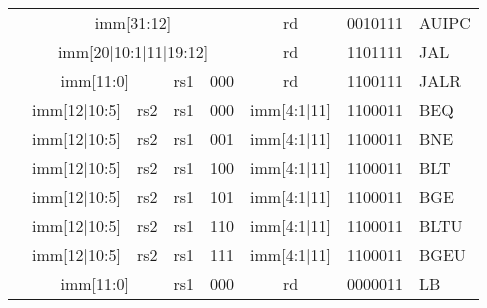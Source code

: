 \begin{table}[p]
\begin{small}
\begin{center}
\begin{tabular}{p{0in}p{0.4in}p{0.05in}p{0.05in}p{0.05in}p{0.05in}p{0.4in}p{0.6in}p{0.4in}p{0.6in}p{0.7in}l}
&
\multicolumn{8}{|c|}{imm[31:12]} &
\multicolumn{1}{c|}{rd} &
\multicolumn{1}{c|}{0010111} & AUIPC \\
\cline{2-11}
  

&
\multicolumn{8}{|c|}{imm[20$\vert$10:1$\vert$11$\vert$19:12]} &
\multicolumn{1}{c|}{rd} &
\multicolumn{1}{c|}{1101111} & JAL \\
\cline{2-11}
  

&
\multicolumn{6}{|c|}{imm[11:0]} &
\multicolumn{1}{c|}{rs1} &
\multicolumn{1}{c|}{000} &
\multicolumn{1}{c|}{rd} &
\multicolumn{1}{c|}{1100111} & JALR \\
\cline{2-11}
  

&
\multicolumn{4}{|c|}{imm[12$\vert$10:5]} &
\multicolumn{2}{c|}{rs2} &
\multicolumn{1}{c|}{rs1} &
\multicolumn{1}{c|}{000} &
\multicolumn{1}{c|}{imm[4:1$\vert$11]} &
\multicolumn{1}{c|}{1100011} & BEQ \\
\cline{2-11}
  

&
\multicolumn{4}{|c|}{imm[12$\vert$10:5]} &
\multicolumn{2}{c|}{rs2} &
\multicolumn{1}{c|}{rs1} &
\multicolumn{1}{c|}{001} &
\multicolumn{1}{c|}{imm[4:1$\vert$11]} &
\multicolumn{1}{c|}{1100011} & BNE \\
\cline{2-11}
  

&
\multicolumn{4}{|c|}{imm[12$\vert$10:5]} &
\multicolumn{2}{c|}{rs2} &
\multicolumn{1}{c|}{rs1} &
\multicolumn{1}{c|}{100} &
\multicolumn{1}{c|}{imm[4:1$\vert$11]} &
\multicolumn{1}{c|}{1100011} & BLT \\
\cline{2-11}
  

&
\multicolumn{4}{|c|}{imm[12$\vert$10:5]} &
\multicolumn{2}{c|}{rs2} &
\multicolumn{1}{c|}{rs1} &
\multicolumn{1}{c|}{101} &
\multicolumn{1}{c|}{imm[4:1$\vert$11]} &
\multicolumn{1}{c|}{1100011} & BGE \\
\cline{2-11}
  

&
\multicolumn{4}{|c|}{imm[12$\vert$10:5]} &
\multicolumn{2}{c|}{rs2} &
\multicolumn{1}{c|}{rs1} &
\multicolumn{1}{c|}{110} &
\multicolumn{1}{c|}{imm[4:1$\vert$11]} &
\multicolumn{1}{c|}{1100011} & BLTU \\
\cline{2-11}
  

&
\multicolumn{4}{|c|}{imm[12$\vert$10:5]} &
\multicolumn{2}{c|}{rs2} &
\multicolumn{1}{c|}{rs1} &
\multicolumn{1}{c|}{111} &
\multicolumn{1}{c|}{imm[4:1$\vert$11]} &
\multicolumn{1}{c|}{1100011} & BGEU \\
\cline{2-11}
  

&
\multicolumn{6}{|c|}{imm[11:0]} &
\multicolumn{1}{c|}{rs1} &
\multicolumn{1}{c|}{000} &
\multicolumn{1}{c|}{rd} &
\multicolumn{1}{c|}{0000011} & LB \\
\cline{2-11}
  


\end{tabular}
\end{center}
\end{small}
\end{table}
